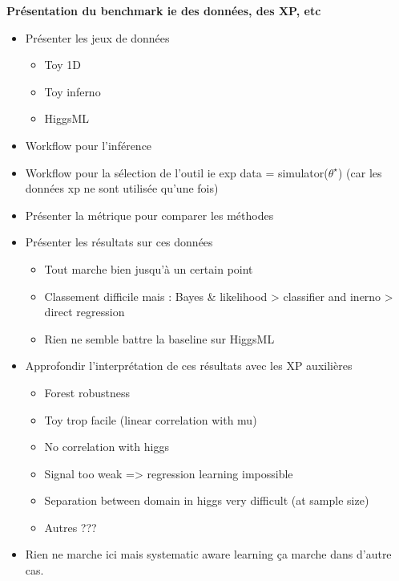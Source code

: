 \textbf{Présentation du benchmark ie des données, des XP, etc}
\begin{itemize}
    \item Présenter les jeux de données
    \begin{itemize}
        \item Toy 1D
        \item Toy inferno
        \item HiggsML
    \end{itemize}
    \item Workflow pour l'inférence
    \item Workflow pour la sélection de l'outil ie exp data = simulator($\theta^\star$) (car les données xp ne sont utilisée qu'une fois)
    \item Présenter la métrique pour comparer les méthodes
    \item Présenter les résultats sur ces données
    \begin{itemize}
        \item Tout marche bien jusqu'à un certain point
        \item Classement difficile mais : Bayes \& likelihood > classifier and inerno > direct regression
        \item Rien ne semble battre la baseline sur HiggsML
    \end{itemize}
    \item Approfondir l'interprétation de ces résultats avec les XP auxilières
    \begin{itemize}
        \item Forest robustness
        \item Toy trop facile (linear correlation with mu)
        \item No correlation with higgs
        \item Signal too weak => regression learning impossible
        \item Separation between domain in higgs very difficult (at sample size)
        \item Autres ???
    \end{itemize}
    \item Rien ne marche ici mais systematic aware learning ça marche dans d'autre cas.
\end{itemize}


